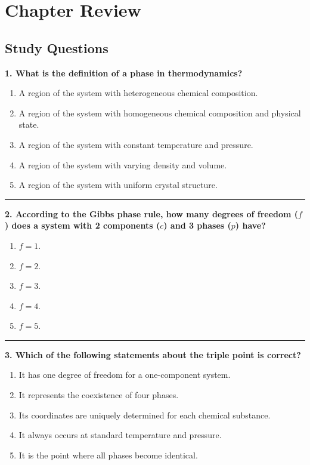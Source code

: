 \documentclass[
  9pt,
]{extbook}
\providecommand{\tightlist}{%
  \setlength{\itemsep}{0pt}\setlength{\parskip}{0pt}}
\theoremstyle{definition}
\theoremstyle{definition}
\theoremstyle{definition}
\theoremstyle{definition}
\theoremstyle{remark}
\begin{document}
\section{Chapter Review}\label{rev12}

\subsection{Study Questions}\label{quest12}

\textbf{1. What is the definition of a phase in thermodynamics?}

\begin{enumerate}
\def\labelenumi{\alph{enumi}.}
\tightlist
\item
  A region of the system with heterogeneous chemical composition.
\item
  A region of the system with homogeneous chemical composition and physical state.
\item
  A region of the system with constant temperature and pressure.
\item
  A region of the system with varying density and volume.
\item
  A region of the system with uniform crystal structure.
\end{enumerate}

\begin{center}\rule{0.5\linewidth}{0.5pt}\end{center}

\textbf{2. According to the Gibbs phase rule, how many degrees of freedom (\(f\)) does a system with 2 components (\(c\)) and 3 phases (\(p\)) have?}

\begin{enumerate}
\def\labelenumi{\alph{enumi}.}
\tightlist
\item
  \(f = 1\).
\item
  \(f = 2\).
\item
  \(f = 3\).
\item
  \(f = 4\).
\item
  \(f = 5\).
\end{enumerate}

\begin{center}\rule{0.5\linewidth}{0.5pt}\end{center}

\textbf{3. Which of the following statements about the triple point is correct?}

\begin{enumerate}
\def\labelenumi{\alph{enumi}.}
\tightlist
\item
  It has one degree of freedom for a one-component system.
\item
  It represents the coexistence of four phases.
\item
  Its coordinates are uniquely determined for each chemical substance.
\item
  It always occurs at standard temperature and pressure.
\item
  It is the point where all phases become identical.
\end{enumerate}
\end{document}
